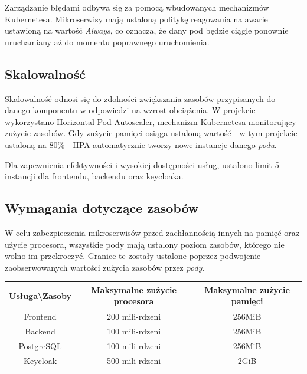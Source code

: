 \documentclass[12pt,a4paper]{article}
\begin{document}
Zarządzanie błędami odbywa się za pomocą wbudowanych mechanizmów Kubernetesa. Mikroserwisy mają ustaloną politykę reagowania na awarie ustawioną na wartość \textit{Always}, co oznacza, że dany pod będzie ciągle ponownie uruchamiany aż do momentu poprawnego uruchomienia.
\newpage
\subsection{Skalowalność}
\label{sec:ExamplesSection}

Skalowalność odnosi się do zdolności zwiększania zasobów przypisanych do danego komponentu w odpowiedzi na wzrost obciążenia. W  projekcie wykorzystano Horizontal Pod Autoscaler, mechanizm Kubernetesa monitorujący zużycie zasobów. Gdy zużycie pamięci osiąga ustaloną wartość - w tym projekcie ustaloną na 80\% - HPA automatycznie tworzy nowe instancje danego \textit{podu}.

Dla zapewnienia efektywności i wysokiej dostępności usług, ustalono limit 5 instancji dla frontendu, backendu oraz keycloaka.

\subsection{Wymagania dotyczące zasobów}
\label{sec:ExampleTables}

W celu zabezpieczenia mikroserwisów przed zachłannością innych na pamięć oraz użycie procesora, wszystkie pody mają ustalony poziom zasobów, którego nie wolno im przekroczyć. Granice te zostały ustalone poprzez podwojenie zaobserwowanych wartości zużycia zasobów przez \textit{pody}. 
\begin{table}[H]
\centering
\begin{tabular}{|c|c|c|}
\hline
Usługa\textbackslash{}Zasoby & Maksymalne zużycie procesora & Maksymalne zużycie pamięci \\ \hline
Frontend                     & 200 mili-rdzeni              & 256MiB                     \\ \hline
Backend                      & 100 mili-rdzeni              & 256MiB                     \\ \hline
PostgreSQL                    & 100 mili-rdzeni              & 256MiB                     \\ \hline
Keycloak                     & 500 mili-rdzeni              & 2GiB                       \\ \hline
\end{tabular}
\end{table}
\end{document}

